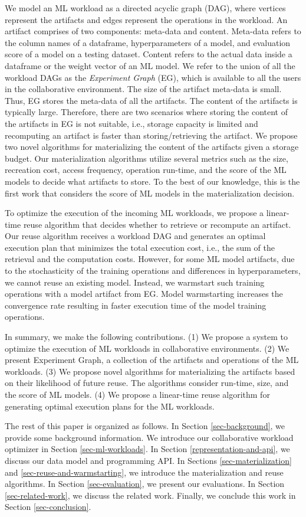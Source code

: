 We model an ML workload as a directed acyclic graph (DAG), where vertices represent the artifacts and edges represent the operations in the workload.
An artifact comprises of two components: meta-data and content.
Meta-data refers to the column names of a dataframe, hyperparameters of a model, and evaluation score of a model on a testing dataset.
Content refers to the actual data inside a dataframe or the weight vector of an ML model.
We refer to the union of all the workload DAGs as the \textit{Experiment Graph} (EG), which is available to all the users in the collaborative environment.
The size of the artifact meta-data is small.
Thus, EG stores the meta-data of all the artifacts.
The content of the artifacts is typically large.
Therefore, there are two scenarios where storing the content of the artifacts in EG is not suitable, i.e., storage capacity is limited and recomputing an artifact is faster than storing/retrieving the artifact.
We propose two novel algorithms for materializing the content of the artifacts given a storage budget.
Our materialization algorithms utilize several metrics such as the size, recreation cost, access frequency, operation run-time, and the score of the ML models to decide what artifacts to store.
To the best of our knowledge, this is the first work that considers the score of ML models in the materialization decision.

To optimize the execution of the incoming ML workloads, we propose a linear-time reuse algorithm that decides whether to retrieve or recompute an artifact.
Our reuse algorithm receives a workload DAG and generates an optimal execution plan that minimizes the total execution cost, i.e., the sum of the retrieval and the computation costs.
However, for some ML model artifacts, due to the stochasticity of the training operations and differences in hyperparameters, we cannot reuse an existing model.
Instead, we warmstart such training operations with a model artifact from EG.
Model warmstarting increases the convergence rate resulting in faster execution time of the model training operations.

In summary, we make the following contributions. (1) We propose a system to optimize the execution of ML workloads in collaborative environments. (2) We present Experiment Graph, a collection of the artifacts and operations of the ML workloads. (3) We propose novel algorithms for materializing the artifacts based on their likelihood of future reuse. The algorithms consider run-time, size, and the score of ML models. (4) We propose a linear-time reuse algorithm for generating optimal execution plans for the ML workloads.

The rest of this paper is organized as follows.
In Section \ref{sec-background}, we provide some background information.
We introduce our collaborative workload optimizer in Section \ref{sec-ml-workloads}.
In Section \ref{representation-and-api}, we discuss our data model and programming API.
In Sections \ref{sec-materialization} and \ref{sec-reuse-and-warmstarting}, we introduce the materialization and reuse algorithms.
In Section \ref{sec-evaluation}, we present our evaluations.
In Section \ref{sec-related-work}, we discuss the related work.
Finally, we conclude this work in Section \ref{sec-conclusion}.